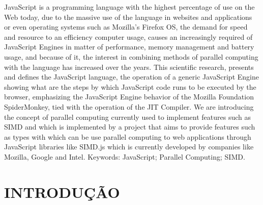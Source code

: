 \documentclass{article}
\begin{document}
JavaScript is a programming language with the highest percentage of use on the Web today,
due to the massive use of the language in websites and applications or even operating
systems such as Mozilla's Firefox OS, the demand for speed and resource to an efficiency
computer usage, causes an increasingly required of JavaScript Engines in matter of
performance, memory management and battery usage, and because of it, the interest in
combining methods of parallel computing with the language has increased over the years.
This scientific research, presents and defines the JavaScript language, the operation of a
generic JavaScript Engine showing what are the steps by which JavaScript code runs to be
executed by the browser, emphasizing the JavaScript Engine behavior of the Mozilla
Foundation SpiderMonkey, tied with the operation of the JIT Compiler. We are introducing the
concept of parallel computing currently used to implement features such as SIMD and which
is implemented by a project that aims to provide features such as types with which can be
use parallel computing to web applications through JavaScript libraries like SIMD.js which is
currently developed by companies like Mozilla, Google and Intel.
Keywords: JavaScript; Parallel Computing; SIMD.

\section{INTRODUÇÃO}
\end{document}

